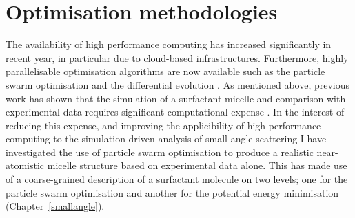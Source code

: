 \section{Optimisation methodologies}

The availability of high performance computing has increased significantly in recent year, in particular due to cloud-based infrastructures.
Furthermore, highly parallelisable optimisation algorithms are now available such as the particle swarm optimisation \cite{kennedy_particle_1995,shi_modified_1998} and the differential evolution \cite{storn_differential_1997}.
As mentioned above, previous work has shown that the simulation of a surfactant micelle and comparison with experimental data requires significant computational expense \cite{hargreaves_atomistic_2011,ivanovic_temperature-dependent_2018}.
In the interest of reducing this expense, and improving the applicibility of high performance computing to the simulation driven analysis of small angle scattering I have investigated the use of particle swarm optimisation to produce a realistic near-atomistic micelle structure based on experimental data alone.
This has made use of a coarse-grained description of a surfactant molecule on two levels; one for the particle swarm optimisation and another for the potential energy minimisation (Chapter~\ref{smallangle}).
